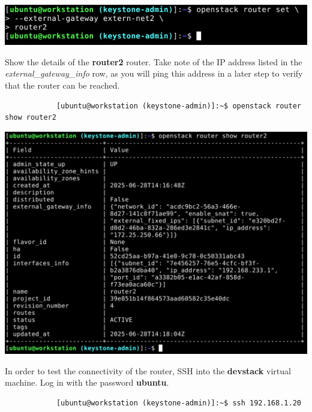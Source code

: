 \documentclass[letterpaper, 12pt]{article}
\begin{document}
\begin{enumerate}
\begin{labstep}
        \begin{center}
            \includegraphics[width=\linewidth]{images/part2/step15.png}
        \end{center}
    \end{labstep}

    \begin{labstep}
        Show the details of the \textbf{router2} router.
        Take note of the IP address listed in the \textit{external\_gateway\_info} row, as you will ping this address in a later step to verify that the router can be reached.
        \begin{lstlisting}
            [ubuntu@workstation (keystone-admin)]:~$ openstack router show router2
        \end{lstlisting}

        \begin{center}
            \includegraphics[width=\linewidth]{images/part2/step16.png}
        \end{center}
    \end{labstep}

    \begin{labstep}
        In order to test the connectivity of the router, SSH into the \textbf{devstack} virtual machine.
        Log in with the password \textbf{ubuntu}.
        \begin{lstlisting}
            [ubuntu@workstation (keystone-admin)]:~$ ssh 192.168.1.20
        \end{lstlisting}


\end{labstep}
\end{enumerate}
\end{document}
